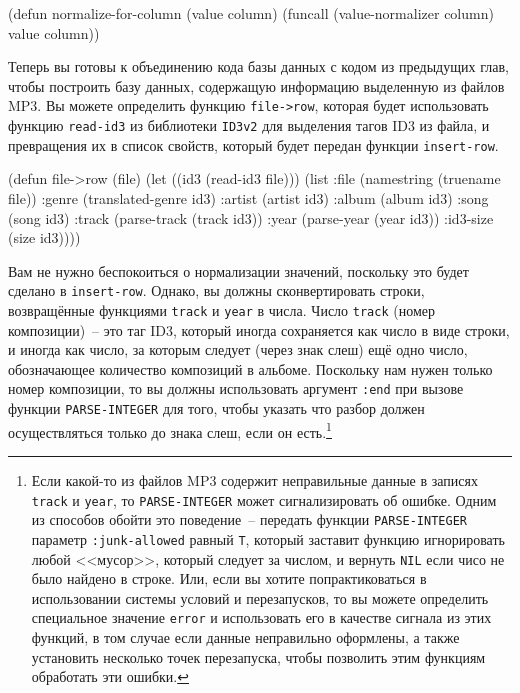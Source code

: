 \begin{myverb}
(defun normalize-for-column (value column)
  (funcall (value-normalizer column) value column))
\end{myverb}

Теперь вы готовы к объединению кода базы данных с кодом из предыдущих глав, чтобы
построить базу данных, содержащую информацию выделенную из файлов MP3.  Вы можете
определить функцию \lstinline{file->row}, которая будет использовать функцию \lstinline{read-id3} из
библиотеки \lstinline{ID3v2} для выделения тагов ID3 из файла, и превращения их в список
свойств, который будет передан функции \lstinline{insert-row}.

\begin{myverb}
(defun file->row (file)
  (let ((id3 (read-id3 file)))
    (list
     :file   (namestring (truename file))
     :genre  (translated-genre id3)
     :artist (artist id3)
     :album  (album id3)
     :song   (song id3)
     :track  (parse-track (track id3))
     :year   (parse-year (year id3))
     :id3-size (size id3))))
\end{myverb}

Вам не нужно беспокоиться о нормализации значений, поскольку это будет сделано в
\lstinline{insert-row}.  Однако, вы должны сконвертировать строки, возвращённые функциями
\lstinline{track} и \lstinline{year} в числа.  Число \lstinline{track} (номер композиции)~-- это таг ID3,
который иногда сохраняется как число в виде строки, и иногда как число, за которым следует
(через знак слеш) ещё одно число, обозначающее количество композиций в альбоме.  Поскольку
нам нужен только номер композиции, то вы должны использовать аргумент \lstinline{:end} при
вызове функции \lstinline{PARSE-INTEGER} для того, чтобы указать что разбор должен
осуществляться только до знака слеш, если он есть.\footnote{Если какой-то из файлов MP3
  содержит неправильные данные в записях \lstinline{track} и \lstinline{year}, то
  \lstinline{PARSE-INTEGER} может сигнализировать об ошибке. Одним из способов обойти это
  поведение~-- передать функции \lstinline{PARSE-INTEGER} параметр \lstinline{:junk-allowed} равный
  \lstinline{T}, который заставит функцию игнорировать любой <<мусор>>, который следует за
  числом, и вернуть \lstinline{NIL} если чисо не было найдено в строке.  Или, если вы хотите
  попрактиковаться в использовании системы условий и перезапусков, то вы можете определить
  специальное значение \lstinline{error} и использовать его в качестве сигнала из этих функций,
  в том случае если данные неправильно оформлены, а также установить несколько точек
  перезапуска, чтобы позволить этим функциям обработать эти ошибки.}

